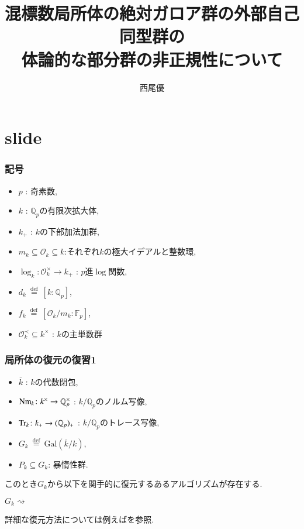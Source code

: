 \documentclass[dvipdfmx,19.8pt]{beamer}
\title{混標数局所体の絶対ガロア群の外部自己同型群の \\ 
 体論的な部分群の非正規性について}
\author{西尾優}
\date{}
\theoremstyle{theorem}
\theoremstyle{definition}
\def\bQ{{\mathbb Q}}
\def\bF{{\mathbb F}}
\def\CalO{{\mathcal O}}
\def\defeq{ \ {\stackrel{\mathrm{def}}{=}} \ }
\begin{document}
\frame{\titlepage}

\section{slide}


\begin{frame}[fragile]
	\frametitle{記号}

\begin{definition}
\begin{itemize}
  \item $p$ : 奇素数,
  \item $k$ : $\bQ_p$の有限次拡大体, 
  \item $k_+$ : $k$の下部加法加群,
  \item $m_k \subseteq \CalO_k \subseteq k $:それぞれ$k$の極大イデアルと整数環, 
  \item $\log_k : \CalO_k^\times \rightarrow k_+$ : $p$進$\log$関数,   
  \item $d_k \defeq [k:\bQ_p]$, 
  \item $f_k \defeq [\CalO_k/m_k : \bF_p ]$, 
  \item $\CalO_k^{\prec} \subseteq k^\times$ : $k$の主単数群 
\end{itemize}
\end{definition}


\end{frame}



\begin{frame}[fragile]
	\frametitle{局所体の復元の復習1}
    
\begin{definition}

\begin{itemize}
  \item $\overline{k}$ : $k$の代数閉包, 
  \item ${\rm Nm}_k \colon k^\times \rightarrow \bQ_p^\times$ : $k/\bQ_p$のノルム写像,  
  \item ${\rm Tr}_k \colon k_+ \rightarrow (\bQ_p)_+$ : $k/\bQ_p$のトレース写像, 
  \item $G_k \defeq \mathrm{Gal}(\overline{k}/k)$, 
  \item $P_k \subseteq G_k$: 暴惰性群. 
\end{itemize}
\end{definition}

このとき$G_k$から以下を関手的に復元するあるアルゴリズムが存在する. 

\begin{center}
$G_k \rightsquigarrow$


\end{center}
詳細な復元方法については例えば\cite{Hoshi1}を参照. 



\end{frame}
\end{document}
